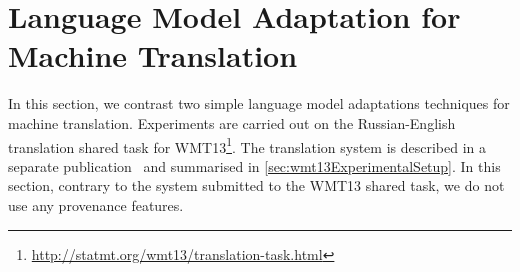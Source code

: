 



\section{Language Model Adaptation for Machine Translation}
\label{sec:domainAdaptationLM}

In this section, we contrast two simple language model adaptations
techniques for machine translation. Experiments are carried out
on the Russian-English translation shared task for
WMT13\footnote{\url{http://statmt.org/wmt13/translation-task.html}}.
The translation system is described in a separate
publication~\citep{pino-waite-xiao-degispert-flego-byrne:2013:WMT}
and summarised in \autoref{sec:wmt13ExperimentalSetup}.
In this section, contrary to the system submitted to the WMT13
shared task, we do not use any provenance features.

